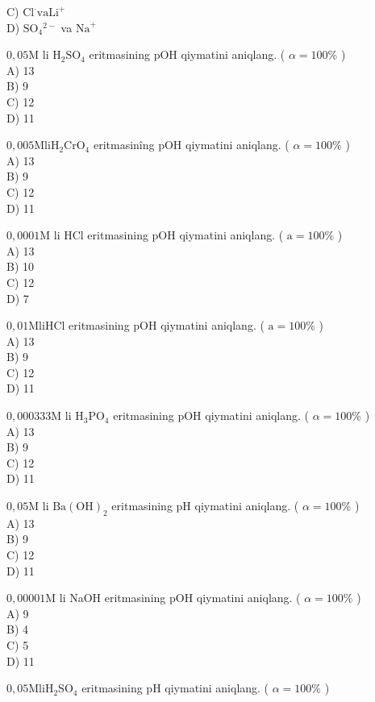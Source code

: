 C) $\mathrm{Cl}^{\cdot} \mathrm{va} \mathrm{Li}^{+}$\\
D) $\mathrm{SO}_{4}{ }^{2-}$ va $\mathrm{Na}^{+}$
  \item $0,05 \mathrm{M}$ li $\mathrm{H}_{2} \mathrm{SO}_{4}$ eritmasining pOH qiymatini aniqlang. ( $\alpha=100 \%$ )\\
A) 13\\
B) 9\\
C) 12\\
D) 11
  \item $0,005 \mathrm{M} \mathrm{li} \mathrm{H}_{2} \mathrm{CrO}_{4}$ eritmasinîng pOH qiymatini aniqlang. ( $\alpha=100 \%$ )\\
A) 13\\
B) 9\\
C) 12\\
D) 11
  \item $0,0001 \mathrm{M}$ li HCl eritmasining pOH qiymatini aniqlang. ( $\mathrm{a}=100 \%$ )\\
A) 13\\
B) 10\\
C) 12\\
D) 7
  \item $0,01 \mathrm{M} \mathrm{li} \mathrm{HCl}$ eritmasining pOH qiymatini aniqlang. ( $\mathrm{a}=100 \%$ )\\
A) 13\\
B) 9\\
C) 12\\
D) 11
  \item $0,000333 \mathrm{M}$ li $\mathrm{H}_{3} \mathrm{PO}_{4}$ eritmasining pOH qiymatini aniqlang. ( $\alpha=100 \%$ )\\
A) 13\\
B) 9\\
C) 12\\
D) 11
  \item $0,05 \mathrm{M}$ li $\mathrm{Ba}(\mathrm{OH})_{2}$ eritmasining pH qiymatini aniqlang. ( $\alpha=100 \%$ )\\
A) 13\\
B) 9\\
C) 12\\
D) 11
  \item $0,00001 \mathrm{M}$ li NaOH eritmasining pOH qiymatini aniqlang. ( $\alpha=100 \%$ )\\
A) 9\\
B) 4\\
C) 5\\
D) 11
  \item $0,05 \mathrm{M} \mathrm{li} \mathrm{H}_{2} \mathrm{SO}_{4}$ eritmasining pH qiymatini aniqlang. ( $\alpha=100 \%$ )\\
